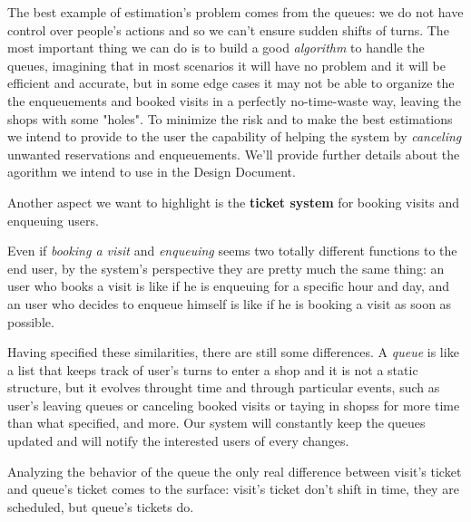 The best example of estimation's problem comes from the queues: we do not have control over people's actions and so we can't ensure sudden shifts of turns. The most important thing we can do is to build a good \textit{algorithm} to handle the queues, imagining that in most scenarios it will have no problem and it will be efficient and accurate, but in some edge cases it may not be able to organize the the enqueuements and booked visits in a perfectly no-time-waste way, leaving the shops with some "holes". To minimize the risk and to make the best estimations we intend to provide to the user the capability of helping the system by \textit{canceling} unwanted reservations and enqueuements. We'll provide further details about the agorithm we intend to use in the Design Document.

Another aspect we want to highlight is the \textbf{ticket system} for booking visits and enqueuing users.

Even if \textit{booking a visit} and \textit{enqueuing} seems two totally different functions to the end user, by the system's perspective they are pretty much the same thing: an user who books a visit is like if he is enqueuing for a specific hour and day, and an user who decides to enqueue himself is like if he is booking a visit as soon as possible. 

Having specified these similarities, there are still some differences. A \textit{queue} is like a list that keeps track of user's turns to enter a shop and it is not a static structure, but it evolves throught time and through particular events, such as user's leaving queues or canceling booked visits or taying in shopss for more time than what specified, and more. Our system will constantly keep the queues updated and will notify the interested users of every changes. 

Analyzing the behavior of the queue the only real difference between visit's ticket and queue's ticket comes to the surface: visit's ticket don't shift in time, they are scheduled, but queue's tickets do.

